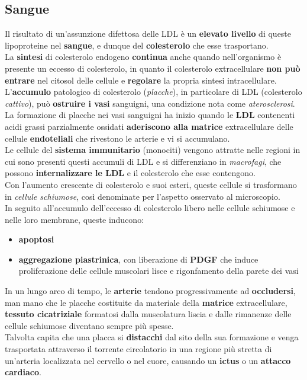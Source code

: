 \documentclass[a4paper, 12pt]{article}
\begin{document}
\begin{titlepage}
\subsection{Sangue}
Il risultato di un’assunzione difettosa delle LDL è un \textbf{elevato livello} di queste lipoproteine nel \textbf{sangue}, e dunque del \textbf{colesterolo} che esse trasportano.\\
La \textbf{sintesi} di colesterolo endogeno \textbf{continua} anche quando nell’organismo è presente un eccesso di colesterolo, in quanto il colesterolo extracellulare \textbf{non può entrare} nel citosol delle cellule e \textbf{regolare} la propria sintesi intracellulare.\\
L’\textbf{accumulo} patologico di colesterolo (\textit{placche}), in particolare di LDL (colesterolo \textit{cattivo}), può \textbf{ostruire i vasi} sanguigni, una condizione nota come \textit{aterosclerosi}.\\
La formazione di placche nei vasi sanguigni ha inizio quando le \textbf{LDL} contenenti acidi grassi parzialmente ossidati \textbf{aderiscono alla matrice} extracellulare delle cellule \textbf{endoteliali} che rivestono le arterie e vi si accumulano.\\ Le cellule del \textbf{sistema immunitario} (monociti) vengono attratte nelle regioni in cui sono presenti questi accumuli di LDL e si differenziano in \textit{macrofagi}, che possono \textbf{internalizzare le LDL} e il colesterolo che esse contengono.\\
Con l'aumento crescente di colesterolo e suoi esteri, queste cellule si trasformano in \textit{cellule schiumose}, così denominate per l'aspetto osservato al microscopio.\\
In seguito all’accumulo dell’eccesso di colesterolo libero nelle cellule schiumose e nelle loro membrane, queste inducono:
\begin{itemize}\item \textbf{apoptosi}
\item \textbf{aggregazione piastrinica}, con liberazione di \textbf{PDGF} che induce proliferazione delle cellule muscolari lisce e rigonfamento della parete dei vasi
\end{itemize}
In un lungo arco di tempo, le \textbf{arterie} tendono progressivamente ad \textbf{occludersi}, man mano che le placche costituite da materiale della \textbf{matrice} extracellulare, \textbf{tessuto cicatriziale} formatosi dalla muscolatura liscia e dalle rimanenze delle cellule schiumose diventano sempre più spesse.\\
Talvolta capita che una placca si \textbf{distacchi} dal sito della sua formazione e venga trasportata attraverso il torrente circolatorio in una regione più stretta di un’arteria localizzata nel cervello o nel cuore, causando un \textbf{ictus} o un \textbf{attacco cardiaco}.


\end{titlepage}
\end{document}
